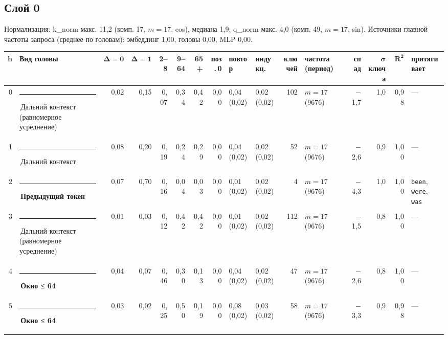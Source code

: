 \documentclass[10pt]{article}
\begin{document}
\noindent\begin{minipage}{\linewidth}
\subsection*{Слой 0}
{\small\color{ink2} Нормализация: k\_norm макс. 11,2 (комп. 17, $m{=}17$, cos), медиана 1,9; q\_norm макс. 4,0 (комп. 49, $m{=}17$, sin). Источники главной частоты запроса (среднее по головам): эмбеддинг 1,00, головы 0,00, MLP 0,00.}
\begin{center}{\footnotesize\begin{tabular}{|r|l|r|r|r|r|r|r|l|l|r|l|r|r|r|l|}
\hline
\rowcolor{head}\textbf{h} & \textbf{Вид головы} & $\boldsymbol{\Delta{=}0}$ & $\boldsymbol{\Delta{=}1}$ & \textbf{2–8} & \textbf{9–64} & \textbf{65+} & \textbf{поз.\,0} & \textbf{повтор} & \textbf{индукц.} & \textbf{ключей} & \textbf{частота (период)} & \textbf{спад} & $\boldsymbol{\sigma}$ \textbf{ключа} & $\boldsymbol{R^2}$ & \textbf{притягивает} \\ \hline
0 & \textcolor[HTML]{C3C2B7}{\rule{0.62em}{0.62em}}\,Дальний контекст (равномерное усреднение) & 0,02 & 0,15 & 0,07 & 0,34 & 0,42 & 0,00 & 0,04 (0,02) & 0,02 (0,02) & 102 & $m{=}17$ (9676) & $-$1,7 & 1,0 & 0,98 & — \\ \hline
1 & \textcolor[HTML]{C3C2B7}{\rule{0.62em}{0.62em}}\,Дальний контекст & 0,08 & 0,20 & 0,19 & 0,24 & 0,29 & 0,00 & 0,04 (0,02) & 0,02 (0,02) & 52 & $m{=}17$ (9676) & $-$2,6 & 0,9 & 1,00 & — \\ \hline
2 & \textcolor[HTML]{2A78D6}{\rule{0.62em}{0.62em}}\,\textbf{Предыдущий токен} & 0,07 & 0,70 & 0,16 & 0,04 & 0,03 & 0,00 & 0,01 (0,02) & 0,02 (0,02) & 4 & $m{=}17$ (9676) & $-$4,3 & 1,0 & 1,00 & \texttt{\textvisiblespace{}been}, \texttt{\textvisiblespace{}were}, \texttt{\textvisiblespace{}was} \\ \hline
3 & \textcolor[HTML]{C3C2B7}{\rule{0.62em}{0.62em}}\,Дальний контекст (равномерное усреднение) & 0,01 & 0,03 & 0,12 & 0,42 & 0,42 & 0,00 & 0,01 (0,02) & 0,02 (0,02) & 112 & $m{=}17$ (9676) & $-$1,5 & 0,8 & 1,00 & — \\ \hline
4 & \textcolor[HTML]{EDA100}{\rule{0.62em}{0.62em}}\,\textbf{Окно ≤ 64} & 0,04 & 0,07 & 0,46 & 0,30 & 0,13 & 0,00 & 0,04 (0,02) & 0,02 (0,02) & 47 & $m{=}17$ (9676) & $-$2,6 & 0,8 & 1,00 & — \\ \hline
5 & \textcolor[HTML]{EDA100}{\rule{0.62em}{0.62em}}\,\textbf{Окно ≤ 64} & 0,03 & 0,02 & 0,25 & 0,50 & 0,19 & 0,00 & 0,08 (0,02) & 0,03 (0,02) & 58 & $m{=}17$ (9676) & $-$3,3 & 0,9 & 0,98 & — \\ \hline

\end{tabular}}
\end{center}
\end{minipage}
\end{document}
